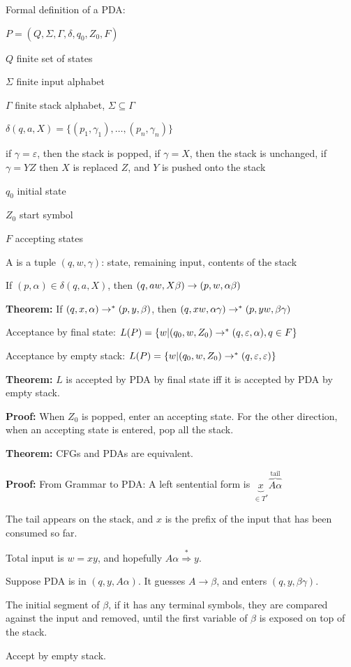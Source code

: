 \begin{frame}
Formal definition of a PDA:

$P=(Q,\Sigma,\Gamma,\delta,q_0,Z_0,F)$

$Q$ finite set of states

$\Sigma$ finite input alphabet

$\Gamma$ finite stack alphabet, $\Sigma\subseteq\Gamma$

$\delta(q,a,X)=\{(p_1,\gamma_1),\ldots,(p_n,\gamma_n)\}$

if $\gamma=\varepsilon$, then the stack is popped, if $\gamma=X$, then
the stack is unchanged, if $\gamma=YZ$ then $X$ is replaced $Z$, and
$Y$ is pushed onto the stack

$q_0$ initial state

$Z_0$ start symbol

$F$ accepting states
\end{frame}

\begin{frame}

A  is a tuple $(q,w,\gamma)$:
state, remaining input, contents of the stack

If $(p,\alpha)\in\delta(q,a,X)$, then
$(q,aw,X\beta)\rightarrow(p,w,\alpha\beta)$

{\bf Theorem:} If $(q,x,\alpha)\rightarrow^*(p,y,\beta)$, then
$(q,xw,\alpha\gamma)\rightarrow^*(p,yw,\beta\gamma)$

Acceptance by final state:
$L(P)=\{w|(q_0,w,Z_0)\rightarrow^*(q,\varepsilon,\alpha),q\in F\}$

Acceptance by empty stack:
$L(P)=\{w|(q_0,w,Z_0)\rightarrow^*(q,\varepsilon,\varepsilon)\}$

{\bf Theorem:} $L$ is accepted by PDA by final state iff it is
accepted by PDA by empty stack.

{\bf Proof:} When $Z_0$ is popped, enter an accepting state.  For the
other direction, when an accepting state is entered, pop all the
stack.
\end{frame}

\begin{frame}

{\bf Theorem:} CFGs and PDAs are equivalent.

{\bf Proof:} From Grammar to PDA:
A left sentential form is $\underbrace{x}_{\in T^*}
\overbrace{A\alpha}^{\text{tail}}$

The tail appears on the stack, and $x$ is the prefix of the input that
has been consumed so far.

Total input is $w=xy$, and hopefully
$A\alpha\stackrel{*}{\Rightarrow}y$.

Suppose PDA is in $(q,y,A\alpha)$.  It guesses
$A\longrightarrow\beta$, and enters $(q,y,\beta\gamma)$.

The initial segment of $\beta$, if it has any terminal symbols, they
are compared against the input and removed, until the first variable
of $\beta$ is exposed on top of the stack.

Accept by empty stack.
\end{frame}

